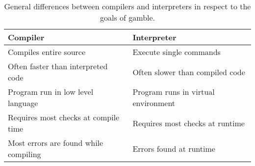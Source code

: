 \begin{table}[h]
    \centering
    \begin{tabular}{|l|l|}
    \hline
    \textbf{Compiler}                           & \textbf{Interpreter}           \\ \hline
    Compiles entire source                      & Execute single commands         \\ \hline 
    Often faster than interpreted code          & Often slower than compiled code \\ \hline
    Program run in low level language           & Program runs in virtual environment      \\ \hline
    Requires most checks at compile time        & Requires most checks at runtime      \\ \hline
    Most errors are found while compiling       & Errors found at runtime \\ \hline 
    \end{tabular} 
    \caption{General differences between compilers and interpreters in respect to the goals of \gls{gamble}.}
    \label{tbl:compint}
\end{table}
